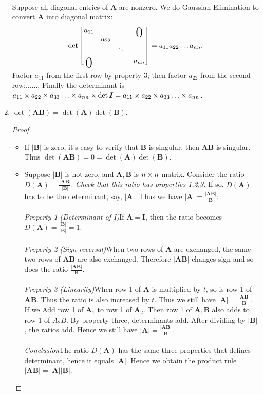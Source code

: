 \begin{enumerate}
\begin{gather*}
\end{gather*}
Suppose all diagonal entries of $\bm A$ are nonzero. We do Gaussian Elimination to convert $\bm A$ into diagonal matrix:
\[
\det\begin{bmatrix}
a_{11}&&&\bigzero\\&a_{22}&&\\&&\ddots&\\\bigzero&&&a_{nn}
\end{bmatrix}=a_{11}a_{22}\dots a_{nn}.
\]
Factor $a_{11}$ from the first row by property 3; then factor $a_{22}$ from the second row;$\dots\dots$. Finally the determinant is $a_{11}\x a_{22}\x a_{33}\dots\x a_{nn}\x\det\bm I=a_{11}\x a_{22}\x a_{33}\dots\x a_{nn}$.
\item 
$\det(\bm{AB})=\det(\bm A)\det(\bm B)$.
\begin{proof}\qquad\\
\begin{itemize}
\item
If $|\bm B|$ is zero, it's easy to verify that $\bm B$ is singular, then $\bm{AB}$ is singular. Thus $\det(\bm{AB})=0=\det(\bm A)\det(\bm B)$.
\item
Suppose $|\bm B|$ is not zero, and $\bm A,\bm B$ is $n\times n$ matrix. Consider the ratio $D(\bm A)=\frac{|\bm{AB}|}{|\bm B|}$. \textit{Check that this ratio has properties 1,2,3.} If so, $D(\bm A)$ has to be the determinant, say, $|\bm A|$. Thus we have $|\bm A|=\frac{|\bm{AB}|}{\bm B}$:\\\\
\emph{Property 1  }\textit{(Determinant of I)}\quad If $\bm A=\bm I$, then the ratio becomes $D(\bm A)=\frac{|\bm B|}{|\bm B|}=1.$\\\\
\emph{Property 2  }\textit{(Sign reversal)}\quad When two rows of $\bm A$ are exchanged, the same two rows of $\bm{AB}$ are also exchanged. Therefore $|\bm{AB}|$ changes sign and so does the ratio $\frac{|\bm{AB}|}{\bm B}$.\\\\
\emph{Property 3  }\textit{(Linearity)}\quad When row 1 of $\bm A$ is multiplied by $t$, so is row 1 of $\bm{AB}$. Thus the ratio is also increased by $t$. Thus we still have $|\bm A|=\frac{|\bm{AB}|}{\bm B}$.\\
If we Add row 1 of $\bm A_1$ to row 1 of $\bm A_2$. Then row 1 of $\bm A_1\bm B$ also adds to row 1 of $A_2B$. By property three, determinants add. After dividing by $|\bm B|$, the ratios add. Hence we still have $|\bm A|=\frac{|\bm{AB}|}{\bm B}$.\\\\
\textit{Conclusion}\qquad The ratio $D(\bm A)$ has the same three properties that defines determinant, hence it equals $|\bm A|$. Hence we obtain the product rule $|\bm{AB}|=|\bm A||\bm B|$.\\
\end{itemize}
\end{proof}


\end{enumerate}
